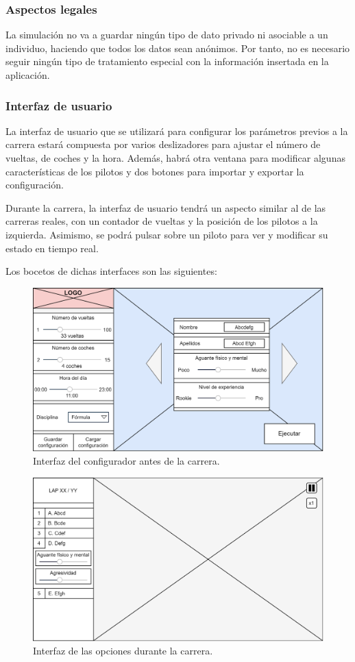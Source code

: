 \subsubsection{Aspectos legales}

La simulación no va a guardar ningún tipo de dato privado ni asociable a un individuo, haciendo que todos los datos sean anónimos. Por tanto, no es necesario seguir ningún tipo de tratamiento especial con la información insertada en la aplicación.

\subsubsection{Interfaz de usuario}

La interfaz de usuario que se utilizará para configurar los parámetros previos a la carrera estará compuesta por varios deslizadores para ajustar el número de vueltas, de coches y la hora. Además, habrá otra ventana para modificar algunas características de los pilotos y dos botones para importar y exportar la configuración.

\bigskip

Durante la carrera, la interfaz de usuario tendrá un aspecto similar al de las carreras reales, con un contador de vueltas y la posición de los pilotos a la izquierda. Asimismo, se podrá pulsar sobre un piloto para ver y modificar su estado en tiempo real.

\newpage

Los bocetos de dichas interfaces son las siguientes:

\begin{figure}[H]
    \centering
    \includegraphics[width=\textwidth]{imagenes/pag1.png}
    \caption{Interfaz del configurador antes de la carrera.}
 \end{figure}

 \begin{figure}[H]
    \centering
    \includegraphics[width=\textwidth]{imagenes/pag2.png}
    \caption{Interfaz de las opciones durante la carrera.}
 \end{figure}